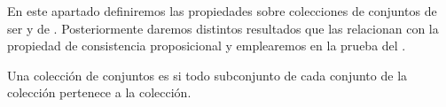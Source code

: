%
\begin{isabellebody}%
%
%
\isadelimtheory
%
\endisadelimtheory
%
\isatagtheory
%
\endisatagtheory
{\isafoldtheory}%
%
\isadelimtheory
%
\endisadelimtheory
%
\begin{isamarkuptext}%
En este apartado definiremos las propiedades sobre colecciones de conjuntos de ser  y de . Posteriormente daremos distintos resultados que las
  relacionan con la propiedad de consistencia proposicional y emplearemos en la prueba del 
  .


  \begin{definicion}
    Una colección de conjuntos es  si todo subconjunto de cada conjunto 
    de la colección pertenece a la colección.
  \end{definicion}


\end{isamarkuptext}
\end{isabellebody}
